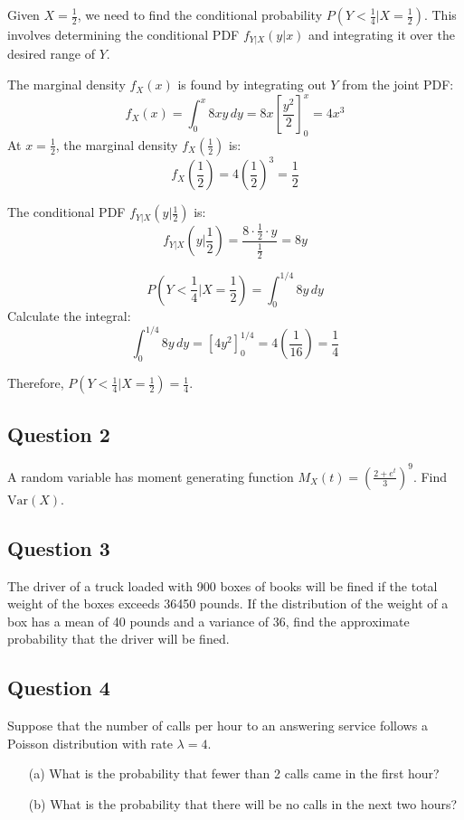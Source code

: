 \documentclass[12pt]{article}
\begin{document}
Given \( X = \frac{1}{2} \), we need to find the conditional probability \( P(Y < \frac{1}{4} | X = \frac{1}{2}) \). This involves determining the conditional PDF \( f_{Y|X}(y|x) \) and integrating it over the desired range of \( Y \).

The marginal density \( f_X(x) \) is found by integrating out \( Y \) from the joint PDF:
\[ f_X(x) = \int_0^x 8xy \, dy = 8x \left[ \frac{y^2}{2} \right]_0^x = 4x^3 \]
At \( x = \frac{1}{2} \), the marginal density \( f_X\left(\frac{1}{2}\right) \) is:
\[ f_X\left(\frac{1}{2}\right) = 4 \left(\frac{1}{2}\right)^3 = \frac{1}{2} \]

The conditional PDF \( f_{Y|X}(y|\frac{1}{2}) \) is:
\[ f_{Y|X}(y|\frac{1}{2}) = \frac{8 \cdot \frac{1}{2} \cdot y}{\frac{1}{2}} = 8y \]

\[ P(Y < \frac{1}{4} | X = \frac{1}{2}) = \int_0^{1/4} 8y \, dy \]
Calculate the integral:
\[ \int_0^{1/4} 8y \, dy = \left[ 4y^2 \right]_0^{1/4} = 4 \left(\frac{1}{16}\right) = \frac{1}{4} \]

Therefore, \( P(Y < \frac{1}{4} | X = \frac{1}{2}) = \frac{1}{4} \).

\newpage
\subsection*{Question 2}
A random variable has moment generating function \( M_X(t) = \left(\frac{2+e^t}{3}\right)^9 \). Find \( \text{Var}(X) \).

\newpage
\subsection*{Question 3}
The driver of a truck loaded with 900 boxes of books will be fined if the total weight of the boxes exceeds 36450 pounds. If the distribution of the weight of a box has a mean of 40 pounds and a variance of 36, find the approximate probability that the driver will be fined.

\newpage
\subsection*{Question 4}
Suppose that the number of calls per hour to an answering service follows a Poisson distribution with rate \( \lambda = 4 \).
\begin{itemize}
  \item[(a)] What is the probability that fewer than 2 calls came in the first hour?
  \item[(b)] What is the probability that there will be no calls in the next two hours?
\end{itemize}
\end{document}
